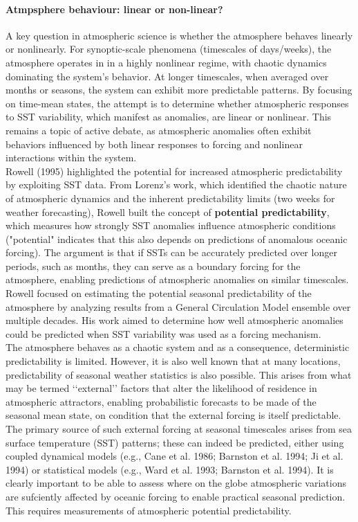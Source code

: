 \paragraph{Atmpsphere behaviour: linear or non-linear?}
A key question in atmospheric science is whether the atmosphere behaves linearly or nonlinearly. For synoptic-scale phenomena (timescales of days/weeks), the atmosphere operates in in a highly nonlinear regime, with chaotic dynamics dominating the system's behavior. At longer timescales, when averaged over months or seasons, the system can exhibit more predictable patterns. By focusing on time-mean states, the attempt is to determine whether atmospheric responses to SST variability, which manifest as anomalies, are linear or nonlinear. This remains a topic of active debate, as atmospheric anomalies often exhibit behaviors influenced by both linear responses to forcing and nonlinear interactions within the system.
\\[0.2 cm]

Rowell (1995)\cite{Ross95} highlighted the potential for increased atmospheric predictability by exploiting SST data. From Lorenz's work, which identified the chaotic nature of atmospheric dynamics and the inherent predictability limits (two weeks for weather forecasting), Rowell built the concept of \textbf{potential predictability}, which measures how strongly SST anomalies influence atmospheric conditions ("potential" indicates that this also depends on predictions of
anomalous oceanic forcing). The argument is that if SSTs can be accurately predicted over longer periods, such as months, they can serve as a boundary forcing for the atmosphere, enabling predictions of atmospheric anomalies on similar timescales. \\
Rowell focused on estimating the potential seasonal predictability of the atmosphere by analyzing results from a General Circulation Model ensemble over multiple decades. His work aimed to determine how well atmospheric anomalies could be predicted when SST variability was used as a forcing mechanism. \\



The atmosphere behaves as a chaotic system and as a consequence, deterministic predictability is limited.
However, it is also well known that at many locations, predictability of seasonal weather statistics is also
possible. This arises from what may be termed ‘‘external’’ factors that alter the likelihood of residence in
atmospheric attractors, enabling probabilistic forecasts to be made of the seasonal mean state, on
condition that the external forcing is itself predictable.
The primary source of such external forcing at seasonal timescales arises from sea surface temperature
(SST) patterns; these can indeed be predicted, either using coupled dynamical models (e.g., Cane et al.
1986; Barnston et al. 1994; Ji et al. 1994) or statistical models (e.g., Ward et al. 1993; Barnston et al. 1994).
It is clearly important to be able to assess where on the globe atmospheric variations are sufciently
affected by oceanic forcing to enable practical seasonal prediction. This requires measurements of
atmospheric potential predictability.

